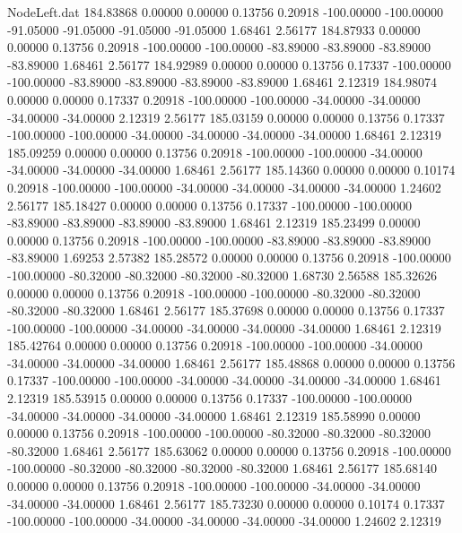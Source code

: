 \begin{filecontents}{NodeLeft.dat}
 184.83868    0.00000    0.00000     0.13756    0.20918 -100.00000 -100.00000  -91.05000  -91.05000  -91.05000  -91.05000    1.68461    2.56177
 184.87933    0.00000    0.00000     0.13756    0.20918 -100.00000 -100.00000  -83.89000  -83.89000  -83.89000  -83.89000    1.68461    2.56177
 184.92989    0.00000    0.00000     0.13756    0.17337 -100.00000 -100.00000  -83.89000  -83.89000  -83.89000  -83.89000    1.68461    2.12319
 184.98074    0.00000    0.00000     0.17337    0.20918 -100.00000 -100.00000  -34.00000  -34.00000  -34.00000  -34.00000    2.12319    2.56177
 185.03159    0.00000    0.00000     0.13756    0.17337 -100.00000 -100.00000  -34.00000  -34.00000  -34.00000  -34.00000    1.68461    2.12319
 185.09259    0.00000    0.00000     0.13756    0.20918 -100.00000 -100.00000  -34.00000  -34.00000  -34.00000  -34.00000    1.68461    2.56177
 185.14360    0.00000    0.00000     0.10174    0.20918 -100.00000 -100.00000  -34.00000  -34.00000  -34.00000  -34.00000    1.24602    2.56177
 185.18427    0.00000    0.00000     0.13756    0.17337 -100.00000 -100.00000  -83.89000  -83.89000  -83.89000  -83.89000    1.68461    2.12319
 185.23499    0.00000    0.00000     0.13756    0.20918 -100.00000 -100.00000  -83.89000  -83.89000  -83.89000  -83.89000    1.69253    2.57382
 185.28572    0.00000    0.00000     0.13756    0.20918 -100.00000 -100.00000  -80.32000  -80.32000  -80.32000  -80.32000    1.68730    2.56588
 185.32626    0.00000    0.00000     0.13756    0.20918 -100.00000 -100.00000  -80.32000  -80.32000  -80.32000  -80.32000    1.68461    2.56177
 185.37698    0.00000    0.00000     0.13756    0.17337 -100.00000 -100.00000  -34.00000  -34.00000  -34.00000  -34.00000    1.68461    2.12319
 185.42764    0.00000    0.00000     0.13756    0.20918 -100.00000 -100.00000  -34.00000  -34.00000  -34.00000  -34.00000    1.68461    2.56177
 185.48868    0.00000    0.00000     0.13756    0.17337 -100.00000 -100.00000  -34.00000  -34.00000  -34.00000  -34.00000    1.68461    2.12319
 185.53915    0.00000    0.00000     0.13756    0.17337 -100.00000 -100.00000  -34.00000  -34.00000  -34.00000  -34.00000    1.68461    2.12319
 185.58990    0.00000    0.00000     0.13756    0.20918 -100.00000 -100.00000  -80.32000  -80.32000  -80.32000  -80.32000    1.68461    2.56177
 185.63062    0.00000    0.00000     0.13756    0.20918 -100.00000 -100.00000  -80.32000  -80.32000  -80.32000  -80.32000    1.68461    2.56177
 185.68140    0.00000    0.00000     0.13756    0.20918 -100.00000 -100.00000  -34.00000  -34.00000  -34.00000  -34.00000    1.68461    2.56177
 185.73230    0.00000    0.00000     0.10174    0.17337 -100.00000 -100.00000  -34.00000  -34.00000  -34.00000  -34.00000    1.24602    2.12319

\end{filecontents}
